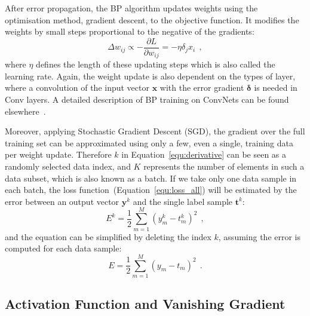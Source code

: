 After error propagation, the BP algorithm updates weights using the optimisation method, gradient descent, to \DIFdelbegin {}\DIFdelend \DIFaddbegin {}\DIFaddend the objective function.
It modifies the weights by small steps proportional to the negative of the gradients:
\begin{equation}
\Delta w_{ij} \propto -\frac{\partial L}{\partial w_{ij}} = -\eta \delta_j x_i~~,
\label{equ:delta_w}
\end{equation}
where $\eta$ defines the length of these updating steps which is also called the learning rate.
Again, the weight update is also dependent on the types of layer, where a convolution of the input vector $\mathbf{x}$ with the error gradient  $\mathbf{\delta}$ is needed in Conv layers.
A detailed description of BP training on ConvNets can be found elsewhere~\citep{bouvrie2006notes}.

Moreover, applying Stochastic Gradient Descent (SGD), the gradient over the full training set can be approximated using only a few, even a single, training data per weight update.
Therefore $k$ in Equation~\ref{equ:derivative} can be seen as a randomly selected data index, and $K$ represents the number of elements in such a data subset, which is also known as a batch.
If we take only one data sample in each batch, the loss function~(Equation~\ref{equ:loss_all}) will be estimated by the error between an output vector $\mathbf{y}^k$ and the single label sample $\mathbf{t}^k$:
\begin{equation}
E^k = \frac{1}{2}\sum_{m=1}^M (y^{k}_{m}-t^{k}_{m})^{2}~~,
\label{equ:error_conv}
\end{equation}
and the equation can be simplified by deleting the index $k$, assuming the error is computed for each data sample:
\begin{equation}
E = \frac{1}{2}\sum_{m=1}^M (y_{m}-t_{m})^{2}~~.
\label{equ:error_non}
\end{equation}


\subsection{Activation Function and Vanishing Gradient}


